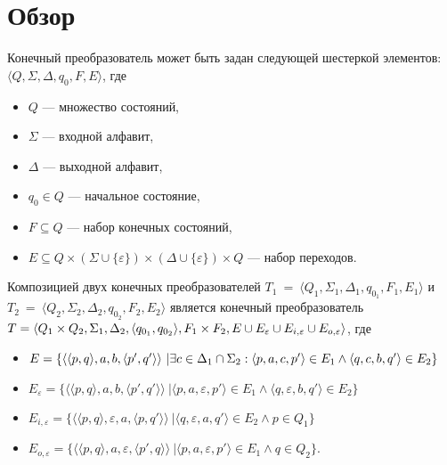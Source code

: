 \section{Обзор}
Конечный преобразователь может быть задан следующей шестеркой элементов: $\langle Q, \Sigma, \Delta, q_0, F, E \rangle$, где

\begin{itemize}
\item $Q$ — множество состояний, 
\item $\Sigma$ — входной алфавит, 
\item $\Delta$ — выходной алфавит, 
\item $q_0 \in Q$ — начальное состояние, 
\item $F \subseteq Q$ — набор конечных состояний, 
\item $E \subseteq Q \times (\Sigma \cup \{\varepsilon\}) \times (\Delta \cup \{\varepsilon\})  \times Q$ — набор переходов. 
\end{itemize}

Композицией двух конечных преобразователей $T_1~=~\langle Q_1, \Sigma_1, \Delta_1, q_{0_{1}}, F_1, E_1 \rangle$ и $T_2~=~\langle Q_2, \Sigma_2, \Delta_2, q_{0_{2}}, F_2, E_2 \rangle$ является конечный преобразователь  $T =\langle Q_1  \times Q_2, \Sigma_1, \Delta_2, \\ \langle q_{0_{1}}, q_{0_{2}} \rangle, F_1 \times F_2, E \cup E_{\varepsilon} \cup E_{i,\varepsilon} \cup E_{o,\varepsilon} \rangle$, где 

\begin{itemize}
\item $E = \{ \langle \langle p, q \rangle, a, b, \langle p', q' \rangle \rangle\ | \exists c \in \Delta_1 \cap \Sigma_2 : \langle p, a, c, p' \rangle \in E_1 \wedge \\\langle q, c, b, q' \rangle \in E_2\}$
\item $E_{\varepsilon} = \{ \langle \langle p, q \rangle, a, b, \langle p', q' \rangle \rangle\ | \langle p, a, {\varepsilon}, p' \rangle \in E_1 \wedge \langle q, {\varepsilon}, b, q' \rangle \in E_2\}$
\item $E_{i, \varepsilon} = \{ \langle \langle p, q \rangle, {\varepsilon}, a, \langle p, q' \rangle \rangle\ | \langle q, {\varepsilon}, a, q' \rangle \in E_2 \wedge p \in Q_1 \} $
\item $E_{o, \varepsilon} = \{ \langle \langle p, q \rangle,  a, {\varepsilon}, \langle p', q \rangle \rangle\ | \langle p, a, {\varepsilon}, p' \rangle \in E_1 \wedge q \in Q_2 \}. $
\end{itemize}

